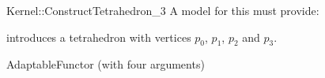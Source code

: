 \begin{ccRefFunctionObjectConcept}{Kernel::ConstructTetrahedron_3}
A model for this must provide:


            {introduces a tetrahedron  with vertices $p_0$, $p_1$, $p_2$ and $p_3$.}

\ccRefines
AdaptableFunctor (with four arguments)

\ccSeeAlso
{} \\

\end{ccRefFunctionObjectConcept}
